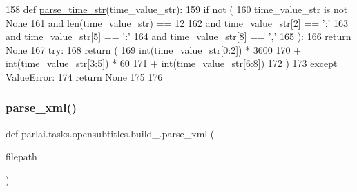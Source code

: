 \begin{DoxyCode}
158 \textcolor{keyword}{def }\hyperlink{namespaceparlai_1_1tasks_1_1opensubtitles_1_1build__2018_aadc6244a9ec9fec904b712f932ec8b40}{parse\_time\_str}(time\_value\_str):
159     \textcolor{keywordflow}{if} \textcolor{keywordflow}{not} (
160         time\_value\_str \textcolor{keywordflow}{is} \textcolor{keywordflow}{not} \textcolor{keywordtype}{None}
161         \textcolor{keywordflow}{and} len(time\_value\_str) == 12
162         \textcolor{keywordflow}{and} time\_value\_str[2] == \textcolor{stringliteral}{':'}
163         \textcolor{keywordflow}{and} time\_value\_str[5] == \textcolor{stringliteral}{':'}
164         \textcolor{keywordflow}{and} time\_value\_str[8] == \textcolor{stringliteral}{','}
165     ):
166         \textcolor{keywordflow}{return} \textcolor{keywordtype}{None}
167     \textcolor{keywordflow}{try}:
168         \textcolor{keywordflow}{return} (
169             \hyperlink{namespacelanguage__model_1_1eval__ppl_a7d12ee00479673c5c8d1f6d01faa272a}{int}(time\_value\_str[0:2]) * 3600
170             + \hyperlink{namespacelanguage__model_1_1eval__ppl_a7d12ee00479673c5c8d1f6d01faa272a}{int}(time\_value\_str[3:5]) * 60
171             + \hyperlink{namespacelanguage__model_1_1eval__ppl_a7d12ee00479673c5c8d1f6d01faa272a}{int}(time\_value\_str[6:8])
172         )
173     \textcolor{keywordflow}{except} ValueError:
174         \textcolor{keywordflow}{return} \textcolor{keywordtype}{None}
175 
176 
\end{DoxyCode}
\mbox{\label{namespaceparlai_1_1tasks_1_1opensubtitles_1_1build__2018_aed965b1234c5fdc4749b646a69b58f8e}} 
\subsubsection{\texorpdfstring{parse\+\_\+xml()}{parse\_xml()}}
{\footnotesize\ttfamily def parlai.\+tasks.\+opensubtitles.\+build\+\_.\+parse\+\_\+xml (\begin{DoxyParamCaption}\item[{}]{filepath }\end{DoxyParamCaption})}



